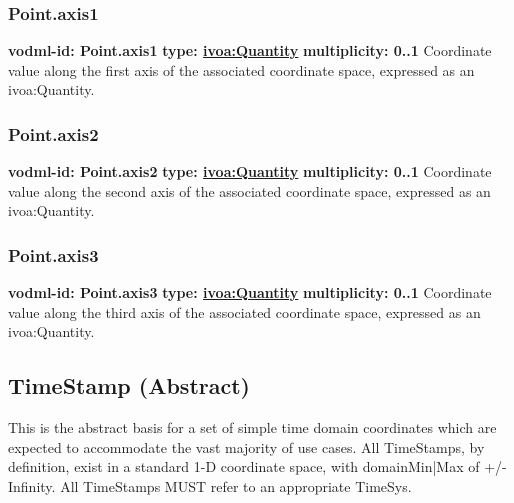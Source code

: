     \subsubsection{Point.axis1}
      \textbf{vodml-id: Point.axis1} \newline
      \textbf{type: \hyperref[sect:ivoa]{ivoa:Quantity}} \newline
      \textbf{multiplicity: 0..1} \newline 
      Coordinate value along the first axis of the associated coordinate space, expressed as an ivoa:Quantity.

    \subsubsection{Point.axis2}
      \textbf{vodml-id: Point.axis2} \newline
      \textbf{type: \hyperref[sect:ivoa]{ivoa:Quantity}} \newline
      \textbf{multiplicity: 0..1} \newline 
      Coordinate value along the second axis of the associated coordinate space, expressed as an ivoa:Quantity.

    \subsubsection{Point.axis3}
      \textbf{vodml-id: Point.axis3} \newline
      \textbf{type: \hyperref[sect:ivoa]{ivoa:Quantity}} \newline
      \textbf{multiplicity: 0..1} \newline 
      Coordinate value along the third axis of the associated coordinate space, expressed as an ivoa:Quantity.


  \subsection{TimeStamp (Abstract)}
  \label{sect:TimeStamp}
    This is the abstract basis for a set of simple time domain coordinates which are expected to accommodate the vast majority of use cases. All TimeStamps, by definition, exist in a standard 1-D coordinate space, with domainMin|Max of +/-Infinity. All TimeStamps MUST refer to an appropriate TimeSys.

